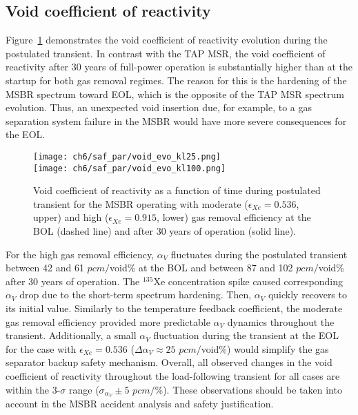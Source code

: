 \subsection{Void coefficient of reactivity}
Figure~\ref{fig:msbr-lf-void-evo} demonstrates the void coefficient of 
reactivity evolution during the postulated transient. 
In contrast with the \gls{TAP} \gls{MSR}, the void coefficient of reactivity 
after 30 years of full-power operation is substantially higher than at the 
startup for both gas removal regimes. The reason for this is the hardening of 
the \gls{MSBR} spectrum toward \gls{EOL}, which is the opposite of the 
\gls{TAP} \gls{MSR} spectrum evolution. Thus, an unexpected void insertion 
due, for example, to a gas separation system failure in the \gls{MSBR} would 
have more severe consequences for the \gls{EOL}. 
\begin{figure}[htbp!] %
	\centering
	\texttt{[image: ch6/saf\_par/void\_evo\_kl25.png]}\\
	\vspace{-12mm}
	\hspace{+0.05mm}
	\texttt{[image: ch6/saf\_par/void\_evo\_kl100.png]}
	\vspace{-3mm}
	\caption{Void coefficient of reactivity as a function of time during 
	postulated transient
for the \gls{MSBR} operating with moderate 
	($\epsilon_{Xe}=0.536$, upper) and high ($\epsilon_{Xe}=0.915$, lower) gas 
	removal efficiency at the \gls{BOL} (dashed line) and after 30 years of 
	operation (solid line).}
	\label{fig:msbr-lf-void-evo}
\end{figure}

For the high gas removal efficiency, $\alpha_V$ fluctuates during the 
postulated transient between 42 and 61 $pcm/$void\% at the \gls{BOL} and 
between 87 and 102 $pcm/$void\% after 30 years of operation. The $^{135}$Xe 
concentration spike caused corresponding $\alpha_V$ drop due to the short-term 
spectrum hardening. Then, $\alpha_V$ quickly recovers to its initial value. 
Similarly to the temperature feedback coefficient, the moderate gas removal 
efficiency provided more predictable $\alpha_V$ dynamics throughout the 
transient. Additionally, a small $\alpha_V$ fluctuation during 
the transient at the \gls{EOL} for the case with $\epsilon_{Xe}=0.536$ 
($\Delta\alpha_V\approx25$ $pcm/$void\%) would simplify the gas separator 
backup safety mechanism. 
Overall, all observed changes in the void coefficient of reactivity throughout 
the load-following transient for all cases are within the 3-$\sigma$ range 
($\sigma_{\alpha_V}\pm5$ $pcm/$\%). These observations should be taken 
into account in the \gls{MSBR} accident analysis and safety
justification.


